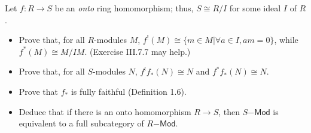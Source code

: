 \documentclass[../../master.tex]{subfiles}
\begin{document}
\begin{problem}
    Let $f : R \to S$ be an \emph{onto} ring homomorphism;
    thus, $S \cong R/I$ for some ideal $I$ of $R$.
    \begin{itemize}
        \item Prove that, for all $R$-modules $M$, $f^{!}(M) \cong \{m \in M | \forall a \in I, am = 0\}$, while $f^{*}(M) \cong M/IM$.
            (Exercise III.7.7 may help.)
        \item Prove that, for all $S$-modules $N$, $f^{!}f_*(N) \cong N$ and $f^{*}f_*(N) \cong N$.
        \item Prove that $f_*$ is fully faithful (Definition 1.6).
        \item Deduce that if there is an onto homomorphism $R \to S$, then $S\mathsf{-Mod}$ is equivalent to a full subcategory of $R\mathsf{-Mod}$.
    \end{itemize}
\end{problem}
\end{document}
